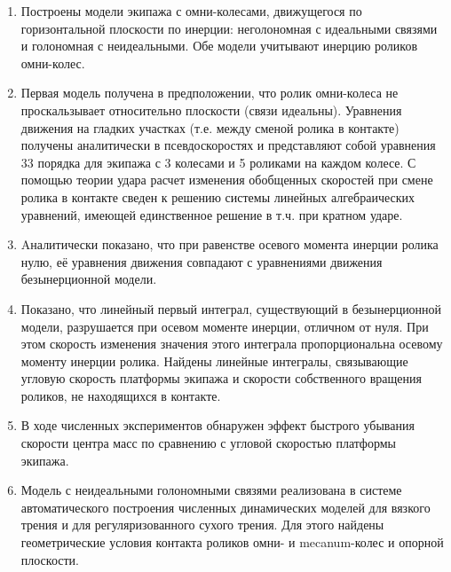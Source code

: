 

\begin{enumerate}

        \item {
            Построены модели экипажа с омни-колесами, движущегося по горизонтальной плоскости по инерции: неголономная с идеальными связями и голономная с неидеальными. Обе модели учитывают инерцию роликов омни-колес.
        }

        \item {
            Первая модель получена в предположении, что ролик омни-колеса не проскальзывает относительно плоскости (связи идеальны). Уравнения движения на гладких участках  (т.е. между сменой ролика в контакте) получены аналитически в псевдоскоростях и представляют собой уравнения 33 порядка для экипажа с 3 колесами и 5 роликами на каждом колесе. С помощью теории удара расчет изменения обобщенных скоростей при смене ролика в контакте сведен к решению системы линейных алгебраических уравнений, имеющей единственное решение в т.ч. при кратном ударе.
        }

        \item {
            Aналитически показано, что при равенстве осевого момента инерции ролика нулю, её уравнения движения совпадают с уравнениями движения безынерционной модели.
        }

        \item {
            Показано, что линейный первый интеграл, существующий в безынерционной модели, разрушается при осевом моменте инерции, отличном от нуля. При этом скорость изменения значения этого интеграла пропорциональна осевому моменту инерции ролика. Найдены линейные интегралы, связывающие угловую скорость платформы экипажа и скорости собственного вращения роликов, не находящихся в контакте.
        }
        
        \item {
            В ходе численных экспериментов обнаружен эффект быстрого убывания скорости центра масс по сравнению с угловой скоростью платформы экипажа.
        }
        
        \item {
            Модель с неидеальными голономными связями реализована в системе автоматического построения численных динамических моделей для вязкого трения и для регуляризованного сухого трения. Для этого найдены геометрические условия контакта роликов омни- и mecanum-колес и опорной плоскости.
        }


\end{enumerate}
